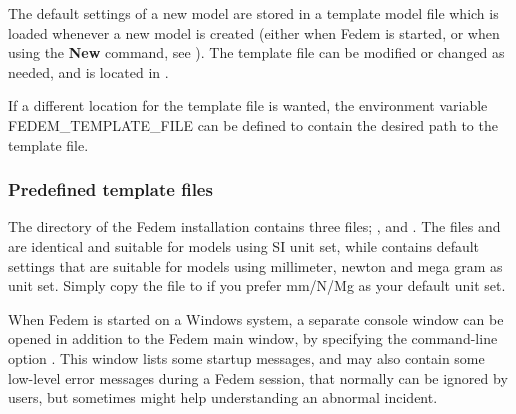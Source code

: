 


The default settings of a new model are stored in a template model file
which is loaded whenever a new model is created
(either when Fedem is started, or when using the \textbf{New} command,
see ).
The template file can be modified or changed as needed, and is located in
.

If a different location for the template file is wanted, the environment
variable FEDEM\_TEMPLATE\_FILE can be defined to contain the desired
path to the template file.

\subsubsection{Predefined template files}

The  directory of the Fedem installation contains three
files; ,  and .
The files  and  are identical and
suitable for models using SI unit set, while  contains
default settings that are suitable for models using millimeter, newton and
mega gram as unit set. Simply copy the file  to
 if you prefer mm/N/Mg as your default unit set.



When Fedem is started on a Windows system, a separate console window can
be opened in addition to the Fedem main window, by specifying the
command-line option . This window lists some startup
messages, and may also contain some low-level error messages during a
Fedem session, that normally can be ignored by users, but sometimes
might help understanding an abnormal incident.



